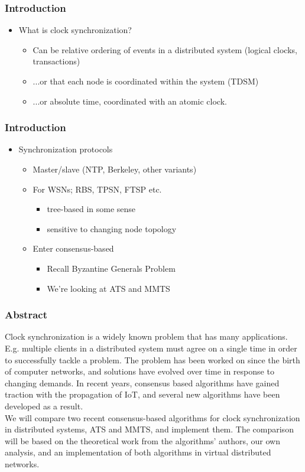 \documentclass{beamer}
\begin{document}
\begin{frame}
  \frametitle{Introduction}
  \begin{itemize}
  \item<1-> What is clock synchronization?
    \begin{itemize}
    \item<2-> Can be relative ordering of events in a distributed system
      (logical clocks, transactions)
    \item<3-> ...or that each node is coordinated within the system (TDSM)
    \item<4-> ...or absolute time, coordinated with an atomic clock.
    \end{itemize}
  \end{itemize}
\end{frame}

\begin{frame}
  \frametitle{Introduction}
  \begin{itemize}
  \item<1-> Synchronization protocols
    \begin{itemize}
    \item<2-> Master/slave (NTP, Berkeley, other variants)
    \item<3-> For WSNs; RBS, TPSN, FTSP etc.      
      \begin{itemize}
      \item<4-> tree-based in some sense
      \item<5-> sensitive to changing node topology
      \end{itemize}      
    \item<6-> Enter consensus-based
      \begin{itemize}
      \item<7-> Recall Byzantine Generals Problem
      \item<8-> We're looking at ATS and MMTS
      \end{itemize}
    \end{itemize}
  \end{itemize}
\end{frame}

\begin{frame}
\frametitle{Abstract}
Clock synchronization is a widely known problem that has many applications. E.g. multiple clients in a distributed system must agree on a single time in order to successfully tackle a problem. The problem has been worked on since the birth of computer networks, and solutions have evolved over time in response to changing demands. In recent years, consensus based algorithms have gained traction with the propagation of IoT, and several new algorithms have been developed as a result.\\
\vspace{1em}
We will compare two recent consensus-based algorithms for clock synchronization in distributed systems, ATS and MMTS, and implement them. The comparison will be based on the theoretical work from the algorithms' authors, our own analysis, and an implementation of both algorithms in virtual distributed networks.
\end{frame}
\end{document}
